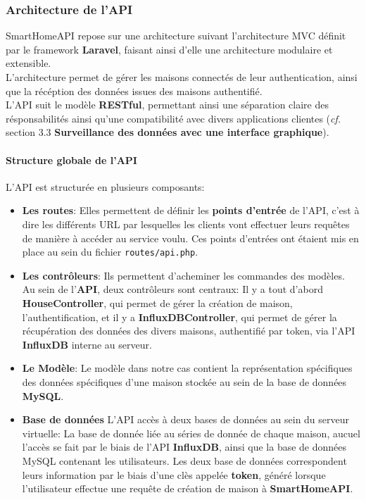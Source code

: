 \documentclass[10pt, a4paper]{report}
\begin{document}
	\subsubsection{Architecture de l'API}
	SmartHomeAPI repose sur une architecture suivant l'architecture MVC définit par le framework \textbf{Laravel}, faisant ainsi d'elle une architecture modulaire et extensible.\\
	L'architecture permet de gérer les maisons connectés de leur authentication, ainsi que la récéption des données issues des maisons authentifié.\\
	L'API suit le modèle \textbf{RESTful}, permettant ainsi une séparation claire des résponsabilités ainsi qu'une compatibilité avec divers applications clientes (\textit{cf.} section 3.3 \textbf{Surveillance des données avec une interface graphique}).
	
	\paragraph{Structure globale de l'API}
	
	L'API est structurée en plusieurs composants:
	\begin{itemize}
		\item \textbf{Les routes}: Elles permettent de définir les \textbf{points d'entrée} de l'API, c'est à dire les différents URL par lesquelles les clients vont effectuer leurs requêtes de manière à accéder au service voulu. Ces points d'entrées ont étaient mis en place au sein du fichier \texttt{routes/api.php}.
		\item \textbf{Les contrôleurs}: Ils permettent d'acheminer les commandes des modèles. Au sein de l'\textbf{API}, deux contrôleurs sont centraux: Il y a tout d'abord \textbf{HouseController}, qui permet de gérer la création de maison, l'authentification, et il y a \textbf{InfluxDBController}, qui permet de gérer la récupération des données des divers maisons, authentifié par token, via l'API \textbf{InfluxDB} interne au serveur.
		\item \textbf{Le Modèle}: Le modèle dans notre cas contient la représentation spécifiques des données spécifiques d'une maison stockée au sein de la base de données \textbf{MySQL}.
		\item \textbf{Base de données} L'API accès à deux bases de données au sein du serveur virtuelle: La base de donnée liée au séries de donnée de chaque maison, aucuel l'accès se fait par le biais de l'API \textbf{InfluxDB}, ainsi que la base de données MySQL contenant les utilisateurs. Les deux base de données correspondent leurs information par le biais d'une clès appelée \textbf{token}, généré lorsque l'utilisateur effectue une requête de création de maison à \textbf{SmartHomeAPI}.
	\end{itemize}
	
\end{document}
